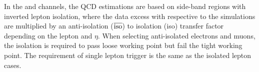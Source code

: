 







In the \ceh and \cmh channels, the QCD estimations are based on side-band regions with inverted lepton isolation, where the data excess with respective to the simulations are multiplied by an anti-isolation ($\rm \overline{iso}$) to isolation (iso) transfer factor depending on the lepton \pt and $\eta$. When selecting anti-isolated electrons and muons, the isolation is required to pass loose working point but fail the tight working point. The requirement of single lepton trigger is the same as the isolated lepton cases. 

